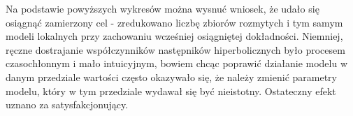 Na podstawie powyższych wykresów można wysnuć wniosek, że udało się osiągnąć zamierzony cel - zredukowano liczbę zbiorów rozmytych i tym samym modeli lokalnych przy zachowaniu wcześniej osiągniętej dokładności. Niemniej, ręczne dostrajanie współczynników następników hiperbolicznych było procesem czasochłonnym i mało intuicyjnym, bowiem chcąc poprawić działanie modelu w danym przedziale wartości często okazywało się, że należy zmienić parametry modelu, który w tym przedziale wydawał się być nieistotny. Ostateczny efekt uznano za satysfakcjonujący. 